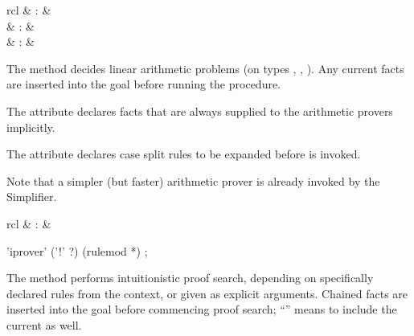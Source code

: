 \begin{isabellebody}
\begin{isamarkuptext}
\end{isamarkuptext}%
\isamarkuptrue%
%
\isamarkuptrue%
%
\begin{isamarkuptext}%
\begin{matharray}{rcl}
    \hypertarget{method.HOL.arith}{\hyperlink{method.HOL.arith}{\mbox{}}} & : &  \\
    \hypertarget{attribute.HOL.arith}{\hyperlink{attribute.HOL.arith}{\mbox{}}} & : &  \\
    \hypertarget{attribute.HOL.arith-split}{\hyperlink{attribute.HOL.arith-split}{\mbox{}}} & : &  \\
  \end{matharray}

  The \hyperlink{method.HOL.arith}{\mbox{}} method decides linear arithmetic problems
  (on types , , ).  Any current
  facts are inserted into the goal before running the procedure.

  The \hyperlink{attribute.HOL.arith}{\mbox{}} attribute declares facts that are
  always supplied to the arithmetic provers implicitly.

  The \hyperlink{attribute.HOL.arith-split}{\mbox{}} attribute declares case split
  rules to be expanded before \hyperlink{method.HOL.arith}{\mbox{}} is invoked.

  Note that a simpler (but faster) arithmetic prover is
  already invoked by the Simplifier.%
\end{isamarkuptext}%
\isamarkuptrue%
%
\isamarkuptrue%
%
\begin{isamarkuptext}%
\begin{matharray}{rcl}
    \hypertarget{method.HOL.iprover}{\hyperlink{method.HOL.iprover}{\mbox{}}} & : &  \\
  \end{matharray}

  \begin{rail}
    'iprover' ('!' ?) (rulemod *)
    ;
  \end{rail}

  The \hyperlink{method.HOL.iprover}{\mbox{}} method performs intuitionistic proof
  search, depending on specifically declared rules from the context,
  or given as explicit arguments.  Chained facts are inserted into the
  goal before commencing proof search; ``\hyperlink{method.HOL.iprover}{\mbox{}}\isa{{\isachardoublequote}{\isacharbang}{\isachardoublequote}}''  means to include the current \hyperlink{fact.prems}{\mbox{}} as well.
  

\end{isamarkuptext}
\end{isabellebody}
